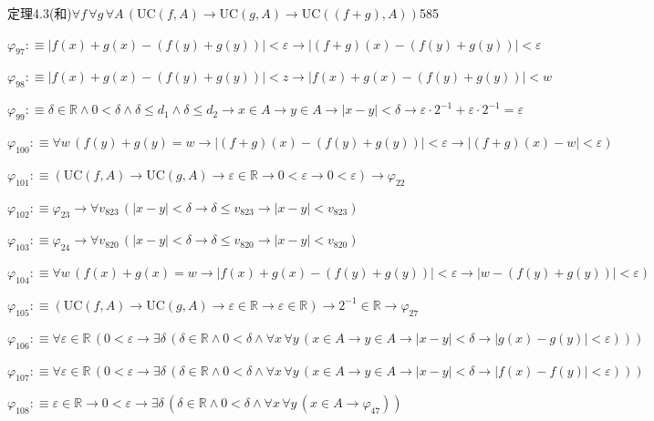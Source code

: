 \begin{fullproof}{定理4.3(和)}{$\forall f\,\forall g\,\forall A\,(\mathrm{UC}(f,A) \to \mathrm{UC}(g,A) \to \mathrm{UC}((f + g),A))$}{585}
\begin{abbrevlist}
\item $\varphi_{97} :\equiv \lvert f(x) + g(x) - (f(y) + g(y)) \rvert < \varepsilon \to \lvert (f + g)(x) - (f(y) + g(y)) \rvert < \varepsilon$
\item $\varphi_{98} :\equiv \lvert f(x) + g(x) - (f(y) + g(y)) \rvert < z \to \lvert f(x) + g(x) - (f(y) + g(y)) \rvert < w$
\item $\varphi_{99} :\equiv \delta \in \mathbb{R} \land 0 < \delta \land \delta \leq d_{1} \land \delta \leq d_{2} \to x \in A \to y \in A \to \lvert x - y \rvert < \delta \to \varepsilon \cdot 2^{-1} + \varepsilon \cdot 2^{-1} = \varepsilon$
\item $\varphi_{100} :\equiv \forall w\,(f(y) + g(y) = w \to \lvert (f + g)(x) - (f(y) + g(y)) \rvert < \varepsilon \to \lvert (f + g)(x) - w \rvert < \varepsilon)$
\item $\varphi_{101} :\equiv (\mathrm{UC}(f,A) \to \mathrm{UC}(g,A) \to \varepsilon \in \mathbb{R} \to 0 < \varepsilon \to 0 < \varepsilon) \to \varphi_{22}$
\item $\varphi_{102} :\equiv \varphi_{23} \to \forall v_{823}\,(\lvert x - y \rvert < \delta \to \delta \leq v_{823} \to \lvert x - y \rvert < v_{823})$
\item $\varphi_{103} :\equiv \varphi_{24} \to \forall v_{820}\,(\lvert x - y \rvert < \delta \to \delta \leq v_{820} \to \lvert x - y \rvert < v_{820})$
\item $\varphi_{104} :\equiv \forall w\,(f(x) + g(x) = w \to \lvert f(x) + g(x) - (f(y) + g(y)) \rvert < \varepsilon \to \lvert w - (f(y) + g(y)) \rvert < \varepsilon)$
\item $\varphi_{105} :\equiv (\mathrm{UC}(f,A) \to \mathrm{UC}(g,A) \to \varepsilon \in \mathbb{R} \to \varepsilon \in \mathbb{R}) \to 2^{-1} \in \mathbb{R} \to \varphi_{27}$
\item $\varphi_{106} :\equiv \forall \varepsilon \in \mathbb{R}\,(0 < \varepsilon \to \exists \delta\,(\delta \in \mathbb{R} \land 0 < \delta \land \forall x\,\forall y\,(x \in A \to y \in A \to \lvert x - y \rvert < \delta \to \lvert g(x) - g(y) \rvert < \varepsilon)))$
\item $\varphi_{107} :\equiv \forall \varepsilon \in \mathbb{R}\,(0 < \varepsilon \to \exists \delta\,(\delta \in \mathbb{R} \land 0 < \delta \land \forall x\,\forall y\,(x \in A \to y \in A \to \lvert x - y \rvert < \delta \to \lvert f(x) - f(y) \rvert < \varepsilon)))$
\item $\varphi_{108} :\equiv \varepsilon \in \mathbb{R} \to 0 < \varepsilon \to \exists \delta\,(\delta \in \mathbb{R} \land 0 < \delta \land \forall x\,\forall y\,(x \in A \to \varphi_{47}))$

\end{abbrevlist}
\end{fullproof}
